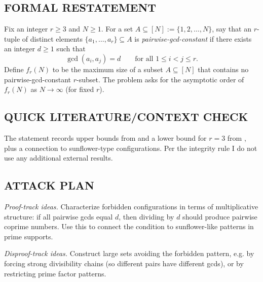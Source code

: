 \subsection*{FORMAL RESTATEMENT}
Fix an integer $r\ge 3$ and $N\ge 1$. For a set $A\subseteq [N]:=\{1,2,\dots,N\}$, say that an $r$-tuple of distinct elements $\{a_1,\dots,a_r\}\subseteq A$ is \emph{pairwise-gcd-constant} if there exists an integer $d\ge 1$ such that
\[
\gcd(a_i,a_j)=d\qquad\text{for all }1\le i<j\le r.
\]
Define $f_r(N)$ to be the maximum size of a subset $A\subseteq [N]$ that contains no pairwise-gcd-constant $r$-subset. The problem asks for the asymptotic order of $f_r(N)$ as $N\to\infty$ (for fixed $r$).

\subsection*{QUICK LITERATURE/CONTEXT CHECK}
The statement records upper bounds from \cite{Er64,AbHa70} and a lower bound for $r=3$ from \cite{Er64}, plus a connection to sunflower-type configurations. Per the integrity rule I do not use any additional external results.

\subsection*{ATTACK PLAN}
\emph{Proof-track ideas.} Characterize forbidden configurations in terms of multiplicative structure: if all pairwise gcds equal $d$, then dividing by $d$ should produce pairwise coprime numbers. Use this to connect the condition to sunflower-like patterns in prime supports.

\emph{Disproof-track ideas.} Construct large sets avoiding the forbidden pattern, e.g. by forcing strong divisibility chains (so different pairs have different gcds), or by restricting prime factor patterns.


